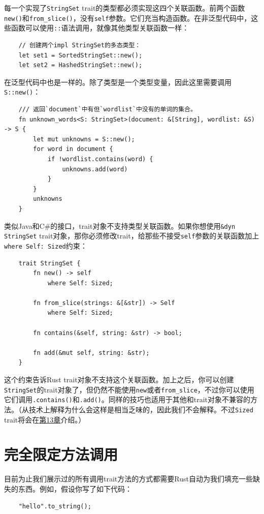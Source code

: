 每一个实现了\texttt{StringSet} trait的类型都必须实现这四个关联函数。前两个函数\texttt{new()}和\texttt{from\_slice()}，没有\texttt{self}参数。它们充当构造函数。在非泛型代码中，这些函数可以使用\texttt{::}语法调用，就像其他类型关联函数一样：
\begin{verbatim}
    // 创建两个impl StringSet的多态类型：
    let set1 = SortedStringSet::new();
    let set2 = HashedStringSet::new();
\end{verbatim}

在泛型代码中也是一样的。除了类型是一个类型变量，因此这里需要调用\texttt{S::new()}：
\begin{verbatim}
    /// 返回`document`中有但`wordlist`中没有的单词的集合。
    fn unknown_words<S: StringSet>(document: &[String], wordlist: &S) -> S {
        let mut unknowns = S::new();
        for word in document {
            if !wordlist.contains(word) {
                unknowns.add(word)
            }
        }
        unknowns
    }
\end{verbatim}

类似Java和C\#的接口，trait对象不支持类型关联函数。如果你想使用\texttt{\&dyn StringSet} trait对象，那你必须修改trait，给那些不接受\texttt{self}参数的关联函数加上\texttt{where Self: Sized}约束：

\begin{verbatim}
    trait StringSet {
        fn new() -> self
            where Self: Sized;

        fn from_slice(strings: &[&str]) -> Self
            where Self: Sized;

        fn contains(&self, string: &str) -> bool;

        fn add(&mut self, string: &str);
    }
\end{verbatim}

这个约束告诉Rust trait对象不支持这个关联函数。加上之后，你可以创建\texttt{StringSet}的trait对象了，但仍然不能使用\texttt{new}或者\texttt{from\_slice}，不过你可以使用它们调用\texttt{.contains()}和\texttt{.add()}。同样的技巧也适用于其他和trait对象不兼容的方法。（从技术上解释为什么会这样是相当乏味的，因此我们不会解释。不过\texttt{Sized} trait将会在\hyperref[ch13]{第13章}介绍。）

\section{完全限定方法调用}\label{fullymethod}

目前为止我们展示过的所有调用trait方法的方式都需要Rust自动为我们填充一些缺失的东西。例如，假设你写了如下代码：
\begin{verbatim}
    "hello".to_string();
\end{verbatim}

